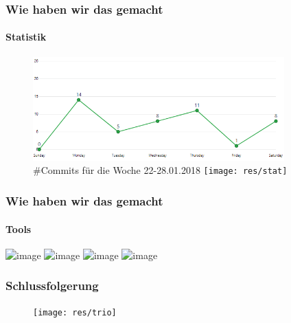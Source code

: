 \documentclass{beamer}
\begin{document}
\begin{frame}
	
	\frametitle{Wie haben wir das gemacht}
	\framesubtitle{Statistik}
	\begin{figure}
		
		\includegraphics[width=.8\textwidth, height = 4cm]{res/git_stat}\newline \vspace{0.3cm}
		\#Commits für die Woche 22-28.01.2018
		\texttt{[image: res/stat]}
	\end{figure}
	
\end{frame}
\begin{frame}
	\frametitle{Wie haben wir das gemacht}
	\framesubtitle{Tools}
	\includegraphics<1>[width=6.7cm, height=3.2cm]{res/tools1}
	\includegraphics<2>[width=\textwidth]{res/tools2}
	\includegraphics<3>[width=\textwidth]{res/tools3}
	\includegraphics<4>[width=\textwidth]{res/tools4}
\end{frame}
\begin{frame}
\frametitle{Schlussfolgerung}
	
\begin{figure}
\texttt{[image: res/trio]}
\end{figure}
\end{frame}

\end{document}
